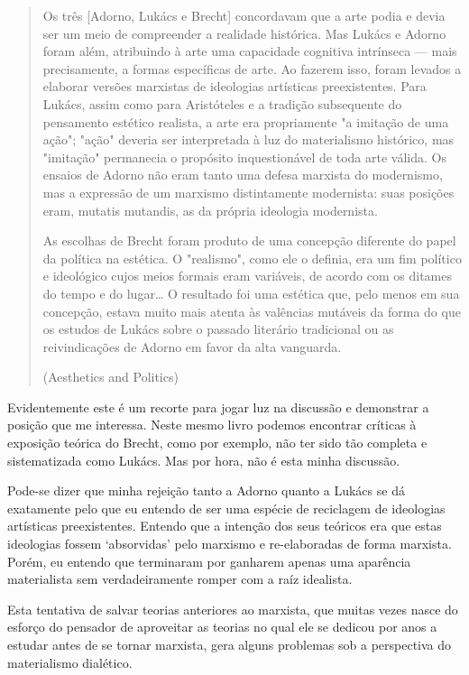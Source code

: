 \begin{quote}
Os três [Adorno, Lukács e Brecht] concordavam que a arte podia e devia ser um meio de compreender a realidade histórica. Mas Lukács e Adorno foram além, atribuindo à arte uma capacidade cognitiva intrínseca — mais precisamente, a formas específicas de arte. Ao fazerem isso, foram levados a elaborar versões marxistas de ideologias artísticas preexistentes. Para Lukács, assim como para Aristóteles e a tradição subsequente do pensamento estético realista, a arte era propriamente "a imitação de uma ação"; "ação" deveria ser interpretada à luz do materialismo histórico, mas "imitação" permanecia o propósito inquestionável de toda arte válida. Os ensaios de Adorno não eram tanto uma defesa marxista do modernismo, mas a expressão de um marxismo distintamente modernista: suas posições eram, mutatis mutandis, as da própria ideologia modernista.

As escolhas de Brecht foram produto de uma concepção diferente do papel da política na estética. O "realismo", como ele o definia, era um fim político e ideológico cujos meios formais eram variáveis, de acordo com os ditames do tempo e do lugar… O resultado foi uma estética que, pelo menos em sua concepção, estava muito mais atenta às valências mutáveis da forma do que os estudos de Lukács sobre o passado literário tradicional ou as reivindicações de Adorno em favor da alta vanguarda.

(Aesthetics and Politics)
\end{quote}

Evidentemente este é um recorte para jogar luz na discussão e demonstrar a posição que me interessa. Neste mesmo livro podemos encontrar críticas à exposição teórica do Brecht, como por exemplo, não ter sido tão completa e sistematizada como Lukács. Mas por hora, não é esta minha discussão.

Pode-se dizer que minha rejeição tanto a Adorno quanto a Lukács se dá exatamente pelo que eu entendo de ser uma espécie de reciclagem de ideologias artísticas preexistentes. Entendo que a intenção dos seus teóricos era que estas ideologias fossem ‘absorvidas’ pelo marxismo e re-elaboradas de forma marxista. Porém, eu entendo que terminaram por ganharem apenas uma aparência materialista sem verdadeiramente romper com a raíz idealista. 

Esta tentativa de salvar teorias anteriores ao marxista, que muitas vezes nasce do esforço do pensador de aproveitar as teorias no qual ele se dedicou por anos a estudar antes de se tornar marxista, gera alguns problemas sob a perspectiva do materialismo dialético. 

